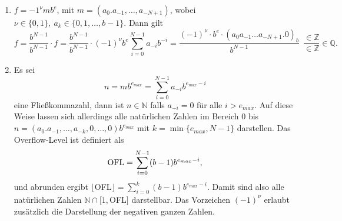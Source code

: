 \begin{enumerate}
	\item $f = -1^{\nu} m b ^{e}$, mit $m=(a_0 . a_{-1}, \dots, a_{-N+1})$, 
wobei $\nu \in \{0,1\},~ a_k\in\{0,1,\ldots, b-1\}$. Dann gilt
$$
	f = \frac{b^{N-1}}{b^{N-1}} \cdot f = \frac{b^{N-1}}{b^{N-1}} \cdot (-1)^{\nu} b^e \sum_{i=0}^{N-1} a_{-i} b^{-i} = \frac{(-1)^{\nu}\cdot b^e \cdot (a_0 a_{-1}\dots a_{-N+1}.0)_b}{b^{N-1}}~~ \frac{\in \mathbb{Z}}{\in \mathbb{Z}} \in  \mathbb{Q}.
$$

	\item Es sei $$n = m b^{e_{max}} = \sum_{i=0}^{N-1} a_{-i} b^{e_{max}-i}$$ 
	eine Fließkommazahl, dann ist $n \in \mathbb{N}$ falls $a_{-i}=0$ für alle $i > e_{max}$. 		
	Auf diese Weise lassen sich allerdings alle natürlichen Zahlen im Bereich $0$ bis 
	$n=(a_0 . a_{-1}, \dots, a_{-k}, 0, \dots, 0) b^{e_{max}}$ mit $k = \min \lbrace e_{max}, N-1 \rbrace$ darstellen.
	Das Overflow-Level ist definiert als 
	$$
		\textnormal{OFL} = \sum_{i=0}^{N-1} (b-1) b^{e_{max}-i},
	$$
	und abrunden ergibt $\lfloor$OFL$\rfloor = \sum_{i=0}^k (b-1) b^{e_{max}-i}$.
	Damit sind also alle natürlichen Zahlen $\mathbb{N} \cap [1,$OFL$]$ 			
	darstellbar. Das Vorzeichen $(-1)^\nu$ erlaubt zusätzlich die Darstellung der negativen ganzen Zahlen.
\end{enumerate}

